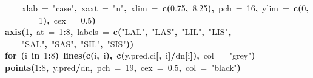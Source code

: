 \documentclass{article}
\makeatletter
\newcommand{\hlnumber}[1]{\textcolor[rgb]{0,0,0}{#1}}%
\newcommand{\hlfunctioncall}[1]{\textcolor[rgb]{.5,0,.33}{\textbf{#1}}}%
\newcommand{\hlstring}[1]{\textcolor[rgb]{.6,.6,1}{#1}}%
\newcommand{\hlkeyword}[1]{\textbf{#1}}%
\newcommand{\hlargument}[1]{\textcolor[rgb]{.69,.25,.02}{#1}}%
\newcommand{\hlsymbol}[1]{#1}%
\newcommand{\hlstd}[1]{\textcolor[rgb]{0,0,0}{#1}}%
\newenvironment{kframe}{%
 \def\FrameCommand##1{\hskip\@totalleftmargin \hskip-\fboxsep
 \colorbox{shadecolor}{##1}\hskip-\fboxsep
     \hskip-\linewidth \hskip-\@totalleftmargin \hskip\columnwidth}%
 \MakeFramed {\advance\hsize-\width
   \@totalleftmargin\z@ \linewidth\hsize
   \@setminipage}}%
 {\par\unskip\endMakeFramed}
\newenvironment{knitrout}{}{} %
\makeatother
\begin{document}
\begin{knitrout}
{\begin{kframe}
\begin{flushleft}
\hlstd{}{\ }{\ }{\ }{\ }\hlargument{xlab}{\ }\hlargument{=}{\ }\hlstring{"case"}\hlkeyword{,}{\ }\hlargument{xaxt}{\ }\hlargument{=}{\ }\hlstring{"n"}\hlkeyword{,}{\ }\hlargument{xlim}{\ }\hlargument{=}{\ }\hlfunctioncall{c}\hlkeyword{(}\hlnumber{0.75}\hlkeyword{,}{\ }\hlnumber{8.25}\hlkeyword{)}\hlkeyword{,}{\ }\hlargument{pch}{\ }\hlargument{=}{\ }\hlnumber{16}\hlkeyword{,}{\ }\hlargument{ylim}{\ }\hlargument{=}{\ }\hlfunctioncall{c}\hlkeyword{(}\hlnumber{0}\hlkeyword{,}\hspace*{\fill}\\
\hlstd{}{\ }{\ }{\ }{\ }{\ }{\ }{\ }{\ }\hlnumber{1}\hlkeyword{)}\hlkeyword{,}{\ }\hlargument{cex}{\ }\hlargument{=}{\ }\hlnumber{0.5}\hlkeyword{)}\hspace*{\fill}\\
\hlstd{}\hlfunctioncall{axis}\hlkeyword{(}\hlnumber{1}\hlkeyword{,}{\ }\hlargument{at}{\ }\hlargument{=}{\ }\hlnumber{1}\hlkeyword{:}\hlnumber{8}\hlkeyword{,}{\ }\hlargument{labels}{\ }\hlargument{=}{\ }\hlfunctioncall{c}\hlkeyword{(}\hlstring{"LAL"}\hlkeyword{,}{\ }\hlstring{"LAS"}\hlkeyword{,}{\ }\hlstring{"LIL"}\hlkeyword{,}{\ }\hlstring{"LIS"}\hlkeyword{,}\hspace*{\fill}\\
\hlstd{}{\ }{\ }{\ }{\ }\hlstring{"SAL"}\hlkeyword{,}{\ }\hlstring{"SAS"}\hlkeyword{,}{\ }\hlstring{"SIL"}\hlkeyword{,}{\ }\hlstring{"SIS"}\hlkeyword{)}\hlkeyword{)}\hspace*{\fill}\\
\hlstd{}\hlkeyword{for}{\ }\hlkeyword{(}\hlsymbol{i}{\ }\hlkeyword{in}{\ }\hlnumber{1}\hlkeyword{:}\hlnumber{8}\hlkeyword{)}{\ }\hlfunctioncall{lines}\hlkeyword{(}\hlfunctioncall{c}\hlkeyword{(}\hlsymbol{i}\hlkeyword{,}{\ }\hlsymbol{i}\hlkeyword{)}\hlkeyword{,}{\ }\hlfunctioncall{c}\hlkeyword{(}\hlsymbol{y.pred.ci}\hlkeyword{[}\hlkeyword{,}{\ }\hlsymbol{i}\hlkeyword{]}\hlkeyword{/}\hlsymbol{d}\hlkeyword{\usebox{\hlnormalsizeboxdollar}}\hlsymbol{n}\hlkeyword{[}\hlsymbol{i}\hlkeyword{]}\hlkeyword{)}\hlkeyword{,}{\ }\hlargument{col}{\ }\hlargument{=}{\ }\hlstring{"grey"}\hlkeyword{)}\hspace*{\fill}\\
\hlstd{}\hlfunctioncall{points}\hlkeyword{(}\hlnumber{1}\hlkeyword{:}\hlnumber{8}\hlkeyword{,}{\ }\hlsymbol{y.pred}\hlkeyword{/}\hlsymbol{d}\hlkeyword{\usebox{\hlnormalsizeboxdollar}}\hlsymbol{n}\hlkeyword{,}{\ }\hlargument{pch}{\ }\hlargument{=}{\ }\hlnumber{19}\hlkeyword{,}{\ }\hlargument{cex}{\ }\hlargument{=}{\ }\hlnumber{0.5}\hlkeyword{,}{\ }\hlargument{col}{\ }\hlargument{=}{\ }\hlstring{"black"}\hlkeyword{)}\mbox{}

\end{flushleft}
\end{kframe}}
\end{knitrout}
\end{document}
